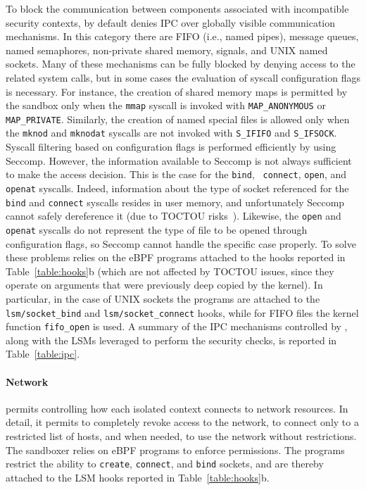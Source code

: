 To block the communication between components associated with
incompatible security contexts, \natisand by default denies IPC over
globally visible communication mechanisms. In this category there are
FIFO (i.e., named pipes), message queues, named semaphores,
non-private shared memory, signals, and UNIX named sockets.  Many of
these mechanisms can be fully blocked by denying access to the related
system calls, but in some cases the evaluation of syscall
configuration flags is necessary. For instance, the creation of shared
memory maps is permitted by the sandbox only when the {\tt mmap}
syscall is invoked with {\tt MAP\_ANONYMOUS} or {\tt
  MAP\_PRIVATE}. Similarly, the creation of named special files is
allowed only when the {\tt mknod} and {\tt mknodat} syscalls are not
invoked with {\tt S\_IFIFO} and {\tt S\_IFSOCK}. Syscall filtering
based on configuration flags is performed efficiently by \natisand using
Seccomp.
However, the information available to Seccomp is not always sufficient
to make the access decision. This is the case for the {\tt bind}, {\tt
  connect}, {\tt open}, and {\tt openat} syscalls.  Indeed,
information about the type of socket referenced for the {\tt bind} and
{\tt connect} syscalls resides in user memory, and unfortunately
Seccomp cannot safely dereference it (due to
TOCTOU risks~\cite{seccomp-toctou}). Likewise, the {\tt open} and {\tt openat} syscalls do
not represent the type of file to be opened through configuration
flags, so Seccomp cannot handle the specific case properly. To solve
these problems \natisand relies on the eBPF programs attached to the hooks
reported in Table~\ref{table:hooks}b (which are not affected by TOCTOU
issues, since they operate on arguments that were previously deep
  copied by the kernel). In particular, in the case of UNIX sockets the programs are
attached to the {\tt lsm/socket\_bind} and {\tt lsm/socket\_connect}
hooks, while for FIFO files the kernel function {\tt fifo\_open} is
used. A summary of the IPC mechanisms controlled by \natisand, along with
the LSMs leveraged to perform the security checks, is reported in
Table~\ref{table:ipc}.

\paragraph{Network}
%
\natisand permits controlling how each isolated context connects to network
resources. In detail, it permits to completely revoke access to the
network, to connect only to a restricted list of hosts, and when
needed, to use the network without restrictions. The sandboxer relies
on eBPF programs to enforce permissions. The programs restrict the
ability to {\tt create}, {\tt connect}, and {\tt bind} sockets, and
are thereby attached to the LSM hooks reported in
Table~\ref{table:hooks}b.

